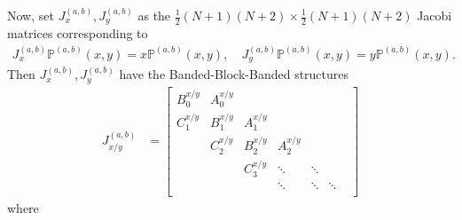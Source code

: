 \documentclass[11pt, oneside]{article}   	%
\newcommand{\half}{\frac{1}{2}}
\newcommand{\bigP}{\mathbb{P}}
\newcommand{\bigPab}{\bigP^{(a,b)}}
\begin{document}
Now, set \(J_x^{(a,b)}, J_y^{(a,b)}\) as the \(\half (N+1)(N+2) \times \half (N+1)(N+2)\) Jacobi matrices corresponding to
\begin{align}
J_x^{(a,b)} \bigPab(x,y) = x \bigPab(x,y), \quad J_y^{(a,b)} \bigPab(x,y) = y \bigPab(x,y).
\end{align}
Then  \(J_x^{(a,b)}, J_y^{(a,b)}\) have the Banded-Block-Banded structures
\begin{align}
J_{x/y}^{(a,b)} &= \begin{bmatrix}
		B^{x/y}_0 & A^{x/y}_0 & & & & \\
		C^{x/y}_1 & B^{x/y}_1 & A^{x/y}_1 & & & \\
		& C^{x/y}_2 & B^{x/y}_2 & A^{x/y}_2  & & & \\
		& & C^{x/y}_3 & \ddots & \ddots & \\
		& & & \ddots & \ddots & \ddots \\
	\end{bmatrix}
\end{align}
where
\end{document}
